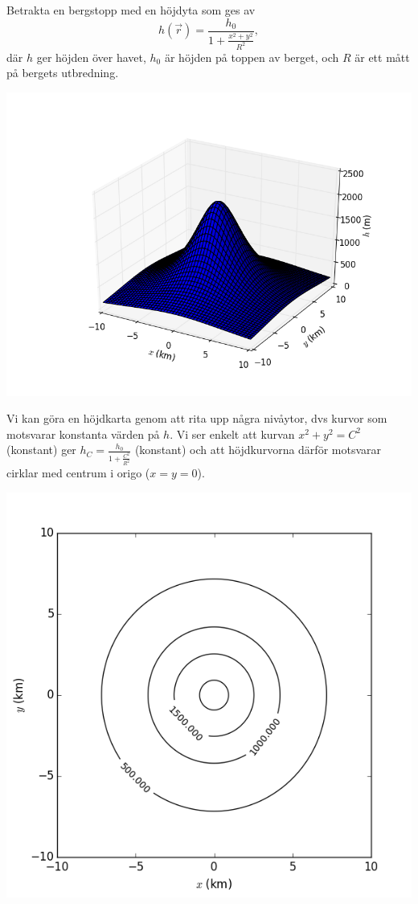 \documentclass[%
oneside,                 %
final,                   %
10pt]{article}
\newenvironment{notice_mdfboxadmon}[1][]{
\begin{notice_mdfboxmdframed}[frametitle=#1]
}
{
\end{notice_mdfboxmdframed}
}
\begin{document}
\begin{notice_mdfboxadmon}

Betrakta en bergstopp med en höjdyta som ges av
\begin{equation}
h(\vec{r}) = \frac{h_0}{1+\frac{x^2+y^2}{R^2}},
\end{equation}
där $h$ ger höjden över havet, $h_0$ är höjden på toppen av berget, och $R$ är ett mått på bergets utbredning.




\vspace{6mm}

\centerline{\includegraphics[width=0.8\linewidth]{fig/hojd_surface.png}}

\vspace{6mm}



Vi kan göra en höjdkarta genom att rita upp några nivåytor, dvs kurvor som motsvarar konstanta värden på $h$. Vi ser enkelt att kurvan $x^2 + y^2 = C^2$ (konstant) ger $h_C = \frac{h_0}{1+\frac{C^2}{R^2}}$ (konstant) och att höjdkurvorna därför motsvarar cirklar med centrum i origo ($x=y=0$).




\vspace{6mm}

\centerline{\includegraphics[width=0.8\linewidth]{fig/hojd_contour.png}}


\end{notice_mdfboxadmon}
\end{document}
